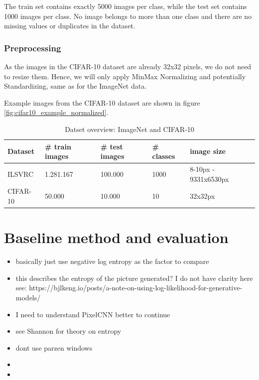 \documentclass[10pt,a4paper,twoside]{article}
\begin{document}
    The train set contains exactly 5000 images per class, while the test set contains 1000 images per class. No image belongs to more than one class and there are no missing values or duplicates in the dataset.

    \subsubsection{Preprocessing}
    As the images in the CIFAR-10 dataset are already 32x32 pixels, we do not need to resize them. Hence, we will only apply MinMax Normalizing and potentially Standardizing, same as for the ImageNet data.

    Example images from the CIFAR-10 dataset are shown in figure \ref{fig:cifar10_example_normalized}.

    \begin{table}[]
        \begin{tabular}{lllll}
        Dataset & \# train images & \# test images & \# classes & image size \\ \hline \hline
          ILSVRC  & 1.281.167    &        100.000        &      1000       &    8-10px - 9331x6530px       \\
        CIFAR-10   &        50.000     &      10.000      &    10    &     32x32px       \\ \hline \hline
        \end{tabular}
        \caption{Datset overview: ImageNet and CIFAR-10}
        \label{tab:datasets}
    \end{table}

\section{Baseline method and evaluation}

\begin{itemize}
    \item basically just use negative log entropy as the factor to compare
    \item this describes the entropy of the picture generated?
    I do not have clarity here see: https://bjlkeng.io/posts/a-note-on-using-log-likelihood-for-generative-models/
    \item I need to understand PixelCNN better to continue
    \item see Shannon for theory on entropy\cite{shannon}
    \item dont use parzen windows\cite{note_on_eval}
    \item
    \item
\end{itemize}
\end{document}
